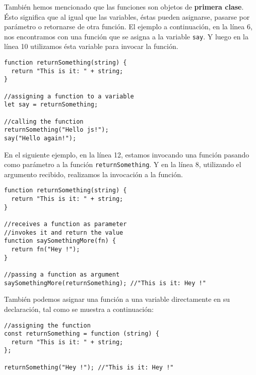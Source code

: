 \documentclass[a4paper, oneside, titlepage, 12pt]{book}
\begin{document}
También hemos mencionado que las funciones son objetos de \textbf{primera clase}. Ésto significa que al igual que las variables, éstas pueden asignarse, pasarse por parámetro o retornarse de otra función. El ejemplo a continuación, en la línea 6, nos encontramos con una función que se asigna a la variable \colorbox{verylight}{\lstinline{say}}. Y luego en la línea 10 utilizamos ésta variable para invocar la función.

\begin{verbatim}
function returnSomething(string) {
  return "This is it: " + string;
}

//assigning a function to a variable
let say = returnSomething;

//calling the function
returnSomething("Hello js!");
say("Hello again!");
\end{verbatim}

En el siguiente ejemplo, en la línea 12, estamos invocando una función pasando como parámetro a la función \texttt{returnSomething}. Y en la línea 8, utilizando el argumento recibido, realizamos la invocación a la función.

\begin{verbatim}
function returnSomething(string) {
  return "This is it: " + string;
}

//receives a function as parameter
//invokes it and return the value
function saySomethingMore(fn) {
  return fn("Hey !");
}

//passing a function as argument
saySomethingMore(returnSomething); //"This is it: Hey !"
\end{verbatim}

También podemos asignar una función a una variable directamente en su declaración, tal como se muestra a continuación:

\begin{verbatim}
//assigning the function
const returnSomething = function (string) {
  return "This is it: " + string;
};

returnSomething("Hey !"); //"This is it: Hey !"
\end{verbatim}
\end{document}
